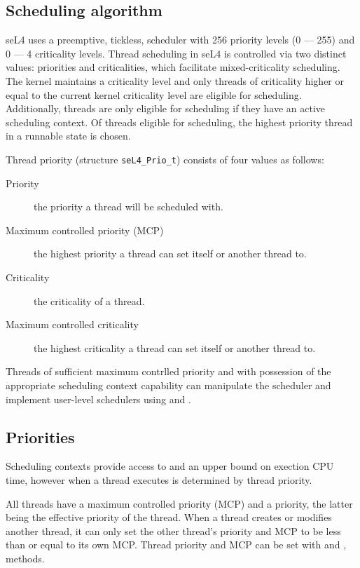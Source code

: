 \subsection{Scheduling algorithm}
\label{sec:sched}

seL4 uses a preemptive, tickless, scheduler with 256 priority levels (0 --- 255) and 0 --- 4 criticality levels.
Thread scheduling in seL4 is controlled via two distinct values: priorities and criticalities, which facilitate mixed-criticality scheduling.
The kernel maintains a criticality level and only threads of criticality higher or equal to the current kernel criticality level are eligible for scheduling.
Additionally, threads are only eligible for scheduling if they have an active scheduling context.
Of threads eligible for scheduling, the highest priority thread in a runnable state is chosen.

Thread priority (structure \texttt{seL4\_Prio\_t}) consists of four values as follows:

\begin{description}
    \item[Priority] the priority a thread will be scheduled with.
    \item[Maximum controlled priority (MCP)] the highest priority a thread can set itself or another thread to.
    \item[Criticality] the criticality of a thread.
    \item[Maximum controlled criticality] the highest criticality a thread can set itself or another thread to.
\end{description}

Threads of sufficient maximum contrlled priority and with possession of the appropriate scheduling context capability can manipulate the scheduler and implement user-level schedulers using  and .

\subsection{Priorities}

Scheduling contexts provide access to and an upper bound on exection CPU time, however when a thread executes is determined by thread priority.

All threads have a maximum controlled priority (MCP) and a priority, the latter being the effective priority of the thread.
When a thread creates or modifies another thread, it can only set the
other thread's priority and MCP to be less than or equal to its own MCP. Thread priority and MCP can be
set with  and
,  methods.

